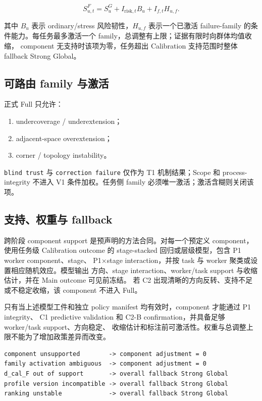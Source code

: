 \[
S^F_{u,t}=S^G_u
+I_{\mathrm{risk},t}B_u
+I_{f,t}H_{u,f}.
\]

其中 \(B_u\) 表示 ordinary/stress 风险韧性，\(H_{u,f}\) 表示一个已激活 failure-family
的条件能力。每任务最多激活一个 family，总调整有上限；证据有限时向群体均值收缩，
component 无支持时该项为零，任务超出 Calibration 支持范围时整体 fallback Strong Global。

\subsection{可路由 family 与激活}

正式 Full 只允许：

\begin{enumerate}
  \item undercoverage / underextension；
  \item adjacent-space overextension；
  \item corner / topology instability。
\end{enumerate}

\texttt{blind trust} 与 \texttt{correction failure} 仅作为 T1 机制结果；Scope 和
process-integrity 不进入 V1 条件加权。任务侧 family 必须唯一激活；激活含糊则关闭该项。

\subsection{支持、权重与 fallback}

跨阶段 component support 是预声明的方法合同。对每一个预定义 component，使用任务级
Calibration outcome 的 stage-stacked 回归或层级模型，包含 P1 worker component、stage、
P1\(\times\)stage interaction，并按 task 与 worker 聚类或设置相应随机效应。模型输出
方向、stage interaction、worker/task support 与收缩估计，并在 Main outcome 可见前冻结。
若 C2 出现清晰的方向反转、支持不足或不稳定收缩，该 component 不进入 Full。

只有当上述模型工件和独立 policy manifest 均有效时，component 才能通过 P1 integrity、
C1 predictive validation 和 C2-B confirmation，并具备足够 worker/task support、方向稳定、
收缩估计和标注前可激活性。权重与总调整上限不能为了增加政策差异而改变。

\begin{verbatim}
component unsupported        -> component adjustment = 0
family activation ambiguous  -> component adjustment = 0
d_cal_F out of support       -> overall fallback Strong Global
profile version incompatible -> overall fallback Strong Global
ranking unstable             -> overall fallback Strong Global
\end{verbatim}

